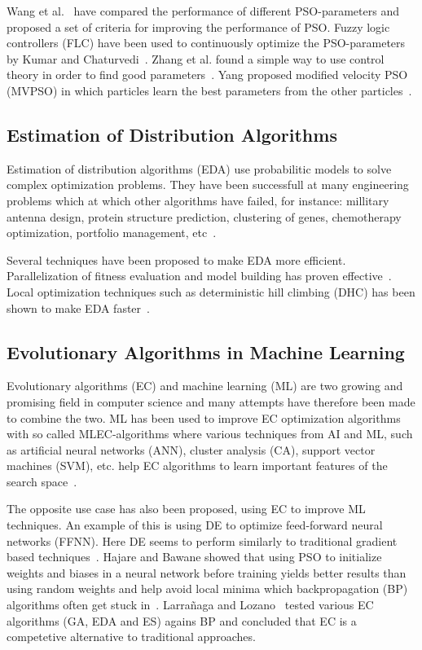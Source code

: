 Wang et al.~\cite{dang2012selection} have compared the performance of different PSO-parameters and proposed a set of criteria for improving the performance of PSO. Fuzzy logic controllers (FLC) have been used to continuously optimize the PSO-parameters by Kumar and Chaturvedi~\cite{kumar2011tuning}. Zhang et al. found a simple way to use control theory in order to find good parameters~\cite{zhang2011simple}. Yang proposed modified velocity PSO (MVPSO) in which particles learn the best parameters from the other particles~\cite{yang2011particle}.


\subsection{Estimation of Distribution Algorithms}

Estimation of distribution algorithms (EDA) use probabilitic models to solve complex optimization problems. They have been successfull at many engineering problems which at which other algorithms have failed, for instance: millitary antenna design, protein structure prediction, clustering of genes, chemotherapy optimization, portfolio management, etc~\cite{Hauschild2011111}.

Several techniques have been proposed to make EDA more efficient. Parallelization of fitness evaluation and model building has proven effective~\cite{sastry2007towards}. Local optimization techniques such as deterministic hill climbing (DHC) has been shown to make EDA faster~\cite{hart1994adaptive}.

\subsection{Evolutionary Algorithms in Machine Learning}

Evolutionary algorithms (EC) and machine learning (ML) are two growing and promising field in computer science and many attempts have therefore been made to combine the two. ML has been used to improve EC optimization algorithms with so called MLEC-algorithms where various techniques from AI and ML, such as artificial neural networks (ANN), cluster analysis (CA), support vector machines (SVM), etc. help EC algorithms to learn important features of the search space~\cite{6052374}.

The opposite use case has also been proposed, using EC to improve ML techniques. An example of this is using DE to optimize feed-forward neural networks (FFNN). Here DE seems to perform similarly to traditional gradient based techniques~\cite{ilonen2003differential}. Hajare and Bawane showed that using PSO to initialize weights and biases in a neural network before training yields better results than using random weights and help avoid local minima which backpropagation (BP) algorithms often get stuck in~\cite{hajare2015feed}. Larra{\~n}aga and Lozano~\cite{larranaga2001estimation} tested various EC algorithms (GA, EDA and ES) agains BP and concluded that EC is a competetive alternative to traditional approaches.

